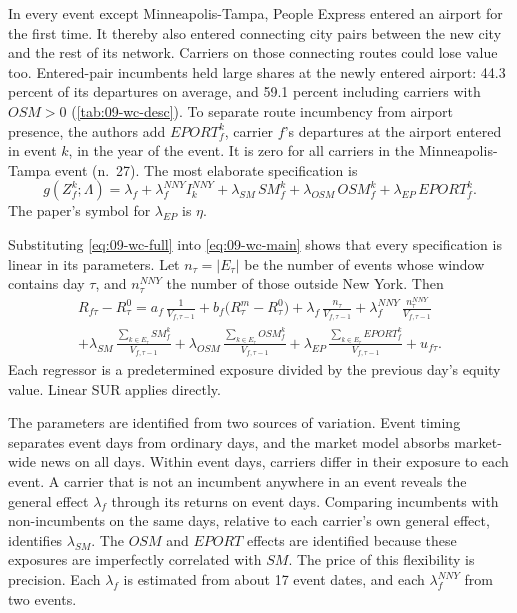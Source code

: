 In every event except Minneapolis-Tampa, People Express entered an airport for the first time. It
thereby also entered connecting city pairs between the new city and the rest of its network. Carriers
on those connecting routes could lose value too. Entered-pair incumbents held large shares at the newly
entered airport: 44.3 percent of its departures on average, and 59.1 percent including carriers with
$\mathit{OSM}>0$ (\cref{tab:09-wc-desc}). To separate route incumbency from airport presence, the
authors add $\mathit{EPORT}^k_f$, carrier $f$'s departures at the airport entered in event $k$, in the
year of the event. It is zero for all carriers in the Minneapolis-Tampa event (n.~27). The most
elaborate specification is
\begin{equation}\label{eq:09-wc-full}
g(Z^k_f;\Lambda)=\lambda_f+\lambda^{NNY}_f I^{NNY}_k+\lambda_{SM}\,\mathit{SM}^k_f
+\lambda_{OSM}\,\mathit{OSM}^k_f+\lambda_{EP}\,\mathit{EPORT}^k_f .
\end{equation}
The paper's symbol for $\lambda_{EP}$ is $\eta$.

Substituting \eqref{eq:09-wc-full} into \eqref{eq:09-wc-main} shows that every specification is
linear in its parameters. Let $n_{\tau}=|E_\tau|$ be the number of events whose window contains day
$\tau$, and $n^{NNY}_{\tau}$ the number of those outside New York. Then
\begin{multline*}
R_{f\tau}-R^0_\tau=a_f\,\frac{1}{V_{f,\tau-1}}+b_f\big(R^m_\tau-R^0_\tau\big)
+\lambda_f\,\frac{n_\tau}{V_{f,\tau-1}}+\lambda^{NNY}_f\,\frac{n^{NNY}_\tau}{V_{f,\tau-1}}\\
+\lambda_{SM}\,\frac{\sum_{k\in E_\tau}\mathit{SM}^k_f}{V_{f,\tau-1}}
+\lambda_{OSM}\,\frac{\sum_{k\in E_\tau}\mathit{OSM}^k_f}{V_{f,\tau-1}}
+\lambda_{EP}\,\frac{\sum_{k\in E_\tau}\mathit{EPORT}^k_f}{V_{f,\tau-1}}+u_{f\tau}.
\end{multline*}
Each regressor is a predetermined exposure divided by the previous day's equity value. Linear SUR
applies directly.

The parameters are identified from two sources of variation. Event timing separates event days from
ordinary days, and the market model absorbs market-wide news on all days. Within event days, carriers
differ in their exposure to each event. A carrier that is not an incumbent anywhere in an event
reveals the general effect $\lambda_f$ through its returns on event days. Comparing incumbents with
non-incumbents on the same days, relative to each carrier's own general effect, identifies
$\lambda_{SM}$. The $\mathit{OSM}$ and $\mathit{EPORT}$ effects are identified because these exposures
are imperfectly correlated with $\mathit{SM}$. The price of this flexibility is precision. Each
$\lambda_f$ is estimated from about 17 event dates, and each $\lambda^{NNY}_f$ from two events.

